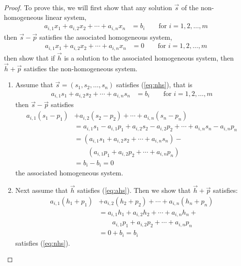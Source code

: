\begin{proof}
To prove this, we will first show that any solution $\vec{s}$ of the non-homogeneous linear system,
%
\begin{align}
a_{i,1} x_1 + a_{i,2} x_2 + \cdots + a_{i,n} x_n & = b_i \qquad \text{for $i=1,2,\ldots,m$}
\label{eq:nhs}
\end{align}
then $\vec{s}-\vec{p}$ satisfies the associated homogeneous system,
%
\begin{align}
a_{i,1} x_1 + a_{i,2} x_2 + \cdots + a_{i,n} x_n & = 0 \qquad \text{for $i=1,2,\ldots,m$}
\label{eq:ahs}
\end{align}
 then show that if $\vec{h}$ is a solution to the associated homogeneous system, then $\vec{h}+\vec{p}$ satisfies the non-homogeneous system.

\begin{enumerate}
\item Assume that $\vec{s}=(s_1,s_2, \ldots,s_n)$ satisfies (\ref{eq:nhs}), that is
%
\begin{align*}
a_{i,1} s_1 + a_{i,2} s_2 + \cdots + a_{i,n} s_n & = b_i \qquad \text{for $i=1,2,\ldots,m$}
\end{align*}
then $\vec{s}-\vec{p}$ satisfies
%
\begin{align*}
a_{i,1} (s_1-p_1)& + a_{i,2}(s_2-p_2) + \cdots + a_{i,n}(s_n-p_n)\\
\qquad & =
a_{i,1} s_1 - a_{i,1} p_1 + a_{i,2} s_2 - a_{i,2} p_2 + \cdots + a_{i,n} s_n - a_{i,n} p_n \\
& = (a_{i,1} s_1 + a_{i,2} s_2 + \cdots + a_{i,n} s_n) - \\
& \qquad
(a_{i,1} p_1 + a_{i,2} p_2 + \cdots + a_{i,n} p_n) \\
& = b_i - b_i = 0
\end{align*}
the associated homogeneous system.

\item Next assume that  $\vec{h}$ satisfies (\ref{eq:ahs}).  Then we show that $\vec{h}+\vec{p}$ satisfies:
%
\begin{align*}
a_{i,1} (h_1+p_1)& + a_{i,2} (h_2+p_2) + \cdots + a_{i,n} (h_n+p_n) \\
 & = a_{i,1} h_1 + a_{i,2} h_2 + \cdots + a_{i,n} h_n + \\
 & \qquad a_{i,1} p_1 + a_{i,2} p_2 + \cdots + a_{i,n} p_n \\
 & = 0 + b_i = b_i
\end{align*}
satisfies (\ref{eq:nhs}).
\end{enumerate}



\end{proof}


